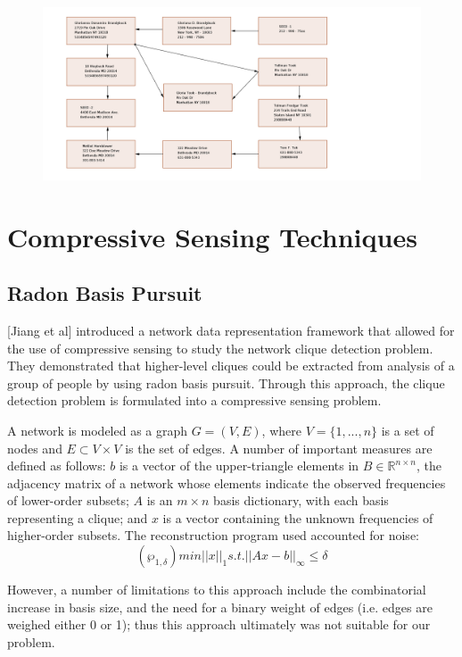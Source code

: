 \documentclass{article} %
\begin{document}
\begin{figure}[ht!]
\includegraphics[scale=0.75]{paths.png}
\label{overflow}
\end{figure}

\newpage
\section{Compressive Sensing Techniques}


\subsection{Radon Basis Pursuit}
[Jiang et al] introduced a network data representation framework that allowed for the use of compressive sensing to study the network clique detection problem. They demonstrated that higher-level cliques could be extracted from analysis of a group of people by using radon basis pursuit. Through this approach, the clique detection problem is formulated into a compressive sensing problem.

A network is modeled as a graph $G = (V, E)$, where $V= \{ 1, ..., n \}$ is a set of nodes and $E \subset V \times V$ is the set of edges. A number of important measures are defined as follows: $b$ is a vector of the upper-triangle elements in $B \in  \mathbb{R}^{n \times n}$, the adjacency matrix of a network whose elements indicate the observed frequencies of lower-order subsets; $A$ is an $m \times n$ basis dictionary, with each basis representing a clique; and $x$ is a vector containing the unknown frequencies of higher-order subsets. The reconstruction program used accounted for noise:
\[
(\wp_{1,\delta}) 	min ||x||_1 s.t. ||Ax-b||_{\infty} \leq \delta
\]

However, a number of limitations to this approach include the combinatorial increase in basis size, and the need for a binary weight of edges (i.e. edges are weighed either 0 or 1); thus this approach ultimately was not suitable for our problem. 
\end{document}
